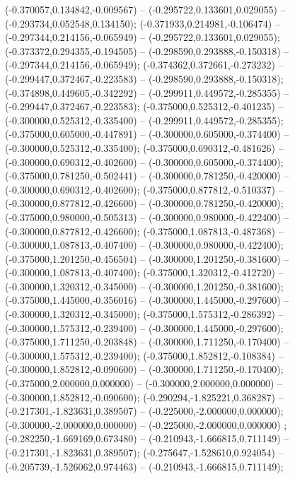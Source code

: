  (-0.370057,0.134842,-0.009567) -- (-0.295722,0.133601,0.029055) -- (-0.293734,0.052548,0.134150);
 (-0.371933,0.214981,-0.106474) -- (-0.297344,0.214156,-0.065949) -- (-0.295722,0.133601,0.029055);
 (-0.373372,0.294355,-0.194505) -- (-0.298590,0.293888,-0.150318) -- (-0.297344,0.214156,-0.065949);
 (-0.374362,0.372661,-0.273232) -- (-0.299447,0.372467,-0.223583) -- (-0.298590,0.293888,-0.150318);
 (-0.374898,0.449605,-0.342292) -- (-0.299911,0.449572,-0.285355) -- (-0.299447,0.372467,-0.223583);
 (-0.375000,0.525312,-0.401235) -- (-0.300000,0.525312,-0.335400) -- (-0.299911,0.449572,-0.285355);
 (-0.375000,0.605000,-0.447891) -- (-0.300000,0.605000,-0.374400) -- (-0.300000,0.525312,-0.335400);
 (-0.375000,0.690312,-0.481626) -- (-0.300000,0.690312,-0.402600) -- (-0.300000,0.605000,-0.374400);
 (-0.375000,0.781250,-0.502441) -- (-0.300000,0.781250,-0.420000) -- (-0.300000,0.690312,-0.402600);
 (-0.375000,0.877812,-0.510337) -- (-0.300000,0.877812,-0.426600) -- (-0.300000,0.781250,-0.420000);
 (-0.375000,0.980000,-0.505313) -- (-0.300000,0.980000,-0.422400) -- (-0.300000,0.877812,-0.426600);
 (-0.375000,1.087813,-0.487368) -- (-0.300000,1.087813,-0.407400) -- (-0.300000,0.980000,-0.422400);
 (-0.375000,1.201250,-0.456504) -- (-0.300000,1.201250,-0.381600) -- (-0.300000,1.087813,-0.407400);
 (-0.375000,1.320312,-0.412720) -- (-0.300000,1.320312,-0.345000) -- (-0.300000,1.201250,-0.381600);
 (-0.375000,1.445000,-0.356016) -- (-0.300000,1.445000,-0.297600) -- (-0.300000,1.320312,-0.345000);
 (-0.375000,1.575312,-0.286392) -- (-0.300000,1.575312,-0.239400) -- (-0.300000,1.445000,-0.297600);
 (-0.375000,1.711250,-0.203848) -- (-0.300000,1.711250,-0.170400) -- (-0.300000,1.575312,-0.239400);
 (-0.375000,1.852812,-0.108384) -- (-0.300000,1.852812,-0.090600) -- (-0.300000,1.711250,-0.170400);
 (-0.375000,2.000000,0.000000) -- (-0.300000,2.000000,0.000000) -- (-0.300000,1.852812,-0.090600);
 (-0.290294,-1.825221,0.368287) -- (-0.217301,-1.823631,0.389507) -- (-0.225000,-2.000000,0.000000);
 (-0.300000,-2.000000,0.000000) -- (-0.225000,-2.000000,0.000000) ;
 (-0.282250,-1.669169,0.673480) -- (-0.210943,-1.666815,0.711149) -- (-0.217301,-1.823631,0.389507);
 (-0.275647,-1.528610,0.924054) -- (-0.205739,-1.526062,0.974463) -- (-0.210943,-1.666815,0.711149);
